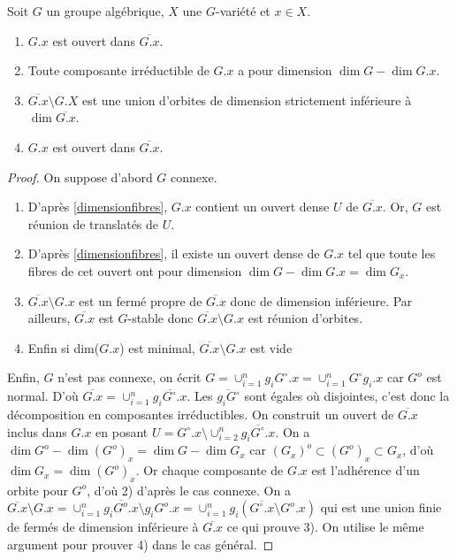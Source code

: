 \begin{prop}
Soit $G$ un groupe algébrique, $X$ une $G$-variété et $x\in X$.
\begin{enumerate}
\item $G.x$ est ouvert dans $\overline{G.x}$.
\item Toute composante irréductible de $G.x$ a pour dimension $\dim G-\dim G.x$.
\item $\overline{G.x}\setminus G.X$ est une union d'orbites de dimension strictement inférieure à $\dim \overline{G.x}$.
\item $G.x$ est ouvert dans $\overline{G.x}$.
\end{enumerate}
\end{prop}
\begin{proof}
On suppose d'abord $G$ connexe.
\begin{enumerate}
\item D'après \ref{dimensionfibres}, $G.x$ contient un ouvert dense $U$ de $\overline{G.x}$. Or, $G$ est réunion de translatés de $U$.
\item D'après \ref{dimensionfibres}, il existe un ouvert dense de $G.x$ tel que toute les fibres de cet ouvert ont pour dimension $\dim G-\dim G.x=\dim G_x$.
\item $\overline{G.x}\setminus G.x$ est un fermé propre de $\overline{G.x}$ donc de dimension inférieure. Par ailleurs, $\overline{G.x}$ est $G$-stable donc $\overline{G.x}\setminus G.x$ est réunion d'orbites.
\item Enfin si dim($G.x$) est minimal, $\overline{G.x}\setminus G.x$ est vide
\end{enumerate}
Enfin, $G$ n'est pas connexe, on écrit $G=\cup_{i=1}^{n}g_iG^\circ .x=\cup_{i=1}^{n}G^\circ g_i.x$ car $G^o$ est normal. D'où $\overline{G.x}=\cup_{i=1}^{n}\overline{g_iG^\circ .x}$. Les $\overline{g_iG^\circ}$ sont égales où disjointes, c'est donc la décomposition en composantes irréductibles. On construit un ouvert de $\overline{G.x}$ inclus dans $G.x$ en posant $U=G^\circ .x\setminus \cup_{i=2}^{n}\overline{g_iG^\circ .x}$. On a $\dim G^o-\dim (G^o) _x=\dim G -\dim G_x$ car $(G_x)^o \subset(G^o)_x \subset G_x$, d'où $\dim G_x=\dim (G^o) _x$. Or chaque composante de $G.x$ est l'adhérence d'un orbite pour $G^o$, d'où 2) d'après le cas connexe. On a $\overline{G.x}\setminus G.x=\cup_{i=1}^{n}\overline{g_iG^o .x}\setminus g_iG^o .x=\cup_{i=1}^{n}g_i(\overline{G^\circ .x}\setminus G^o .x)$ qui est une union finie de fermés de dimension inférieure à $\overline{G .x}$ ce qui prouve 3). On utilise le même argument pour prouver 4) dans le cas général.
\end{proof}

